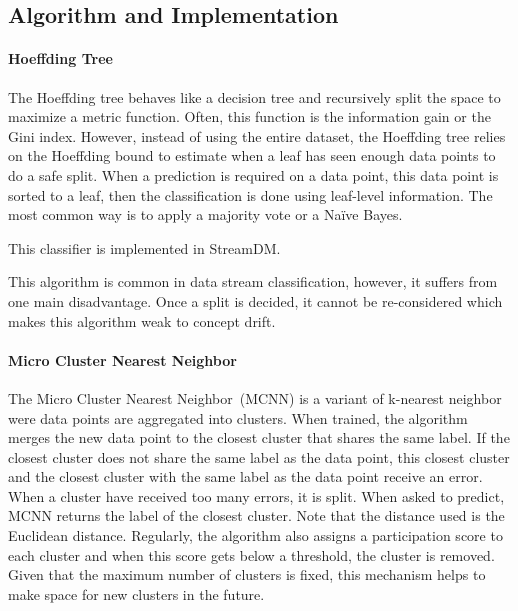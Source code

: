 \subsection{Algorithm and Implementation}
\paragraph{Hoeffding Tree~\cite{VFDT}}
The Hoeffding tree behaves like a decision tree
and recursively split the space to maximize a
metric function. Often, this function is the
information gain or the Gini index. However,
instead of using the entire dataset, the Hoeffding
tree relies on the Hoeffding bound to estimate
when a leaf has seen enough data points to do a
safe split. When a prediction is required on a
data point, this data point is sorted to a leaf,
then the classification is done using leaf-level
information. The most common way is to apply a
majority vote or a Naïve Bayes.

This classifier is implemented in StreamDM.

This algorithm is common in data stream
classification, however, it suffers from one main
disadvantage. Once a split is decided, it cannot
be re-considered which makes this algorithm weak
to concept drift.

\paragraph{Micro Cluster Nearest Neighbor~\cite{mc-nn}}
The Micro Cluster Nearest Neighbor~(MCNN) is a
variant of k-nearest neighbor were data points are
aggregated into clusters.  When trained, the
algorithm merges the new data point to the closest
cluster that shares the same label. If the closest
cluster does not share the same label as the data
point, this closest cluster and the closest
cluster with the same label as the data point
receive an error. When a cluster have received too
many errors, it is split. When asked to predict,
MCNN returns the label of the closest cluster.
Note that the distance used is the Euclidean
distance.  Regularly, the algorithm also assigns a
participation score to each cluster and when this
score gets below a threshold, the cluster is
removed. Given that the maximum number of clusters
is fixed, this mechanism helps to make space for
new clusters in the future.  

